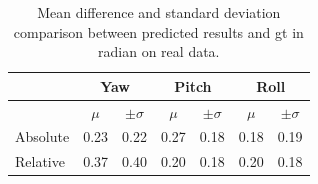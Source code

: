 \begin{table}
  \centering
  \caption{Mean difference and standard deviation comparison between predicted
    results and \gls{gt} in radian on real data.}
  \begin{tabular}{l cc cc cc}
    \toprule
    & \multicolumn{2}{c}{Yaw} & \multicolumn{2}{c}{Pitch} &
                                                            \multicolumn{2}{c}{Roll}\\
    \midrule
    & $\mu$ & $\pm \sigma$ &  $\mu$ & $\pm \sigma$ &  $\mu$ & $\pm \sigma$\\
    \cmidrule{2-3} \cmidrule{4-5} \cmidrule{6-7}

    Absolute & 0.23 & 0.22 & 0.27 & 0.18 & 0.18 & 0.19 \\
    Relative & 0.37 & 0.40 & 0.20 & 0.18 & 0.20 & 0.18\\
    \bottomrule
  \end{tabular}
  \label{tab:tab1}
\end{table}











